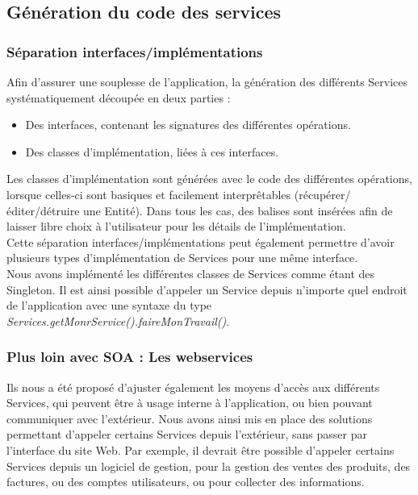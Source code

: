 
\subsection{Génération du code des services}

\subsubsection{Séparation interfaces/implémentations}

Afin d'assurer une souplesse de l'application, la génération des différents Services systématiquement découpée en deux parties :
\begin{itemize}
\item Des interfaces, contenant les signatures des différentes opérations.
\item Des classes d'implémentation, liées à ces interfaces.
\end{itemize}	

Les classes d'implémentation sont générées avec le code des différentes opérations, lorsque celles-ci sont basiques et facilement interprêtables (récupérer/éditer/détruire une Entité). Dans tous les cas, des balises  sont insérées afin de laisser libre choix à l'utilisateur pour les détails de l'implémentation.\\
Cette séparation interfaces/implémentations peut également permettre d'avoir plusieurs types d'implémentation de Services pour une même interface.\\
Nous avons implémenté les différentes classes de Services comme étant des Singleton. Il est ainsi possible d'appeler un Service depuis n'importe quel endroit de l'application avec une syntaxe du type \textit{Services.getMonrService().faireMonTravail()}.

\subsubsection{Plus loin avec SOA : Les webservices}

Ils nous a été proposé d'ajuster également les moyens d'accès aux différents Services, qui peuvent être à usage interne à l'application, ou bien pouvant communiquer avec l'extérieur.
Nous avons ainsi mis en place des solutions permettant d'appeler certains Services depuis l'extérieur, sans passer par l'interface du site Web.
Par exemple, il devrait être possible d'appeler certains Services depuis un logiciel de gestion, pour la gestion des ventes des produits, des factures, ou des comptes utilisateurs, ou pour collecter des informations.

